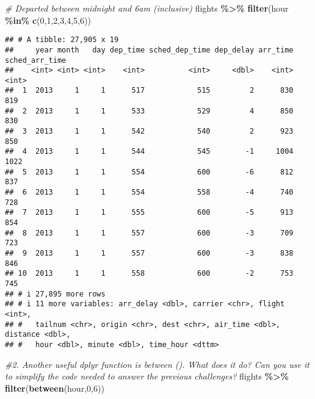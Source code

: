 \documentclass[
]{article}
\newenvironment{Shaded}{\begin{snugshade}}{\end{snugshade}}
\newcommand{\CommentTok}[1]{\textcolor[rgb]{0.56,0.35,0.01}{\textit{#1}}}
\newcommand{\DecValTok}[1]{\textcolor[rgb]{0.00,0.00,0.81}{#1}}
\newcommand{\FunctionTok}[1]{\textcolor[rgb]{0.13,0.29,0.53}{\textbf{#1}}}
\newcommand{\NormalTok}[1]{#1}
\newcommand{\SpecialCharTok}[1]{\textcolor[rgb]{0.81,0.36,0.00}{\textbf{#1}}}
\begin{document}
\begin{Shaded}
\begin{Highlighting}[]
  \CommentTok{\# Departed between midnight and 6am (inclusive)}
\NormalTok{  flights }\SpecialCharTok{\%\textgreater{}\%} \FunctionTok{filter}\NormalTok{(hour }\SpecialCharTok{\%in\%} \FunctionTok{c}\NormalTok{(}\DecValTok{0}\NormalTok{,}\DecValTok{1}\NormalTok{,}\DecValTok{2}\NormalTok{,}\DecValTok{3}\NormalTok{,}\DecValTok{4}\NormalTok{,}\DecValTok{5}\NormalTok{,}\DecValTok{6}\NormalTok{))}
\end{Highlighting}
\end{Shaded}

\begin{verbatim}
## # A tibble: 27,905 x 19
##     year month   day dep_time sched_dep_time dep_delay arr_time sched_arr_time
##    <int> <int> <int>    <int>          <int>     <dbl>    <int>          <int>
##  1  2013     1     1      517            515         2      830            819
##  2  2013     1     1      533            529         4      850            830
##  3  2013     1     1      542            540         2      923            850
##  4  2013     1     1      544            545        -1     1004           1022
##  5  2013     1     1      554            600        -6      812            837
##  6  2013     1     1      554            558        -4      740            728
##  7  2013     1     1      555            600        -5      913            854
##  8  2013     1     1      557            600        -3      709            723
##  9  2013     1     1      557            600        -3      838            846
## 10  2013     1     1      558            600        -2      753            745
## # i 27,895 more rows
## # i 11 more variables: arr_delay <dbl>, carrier <chr>, flight <int>,
## #   tailnum <chr>, origin <chr>, dest <chr>, air_time <dbl>, distance <dbl>,
## #   hour <dbl>, minute <dbl>, time_hour <dttm>
\end{verbatim}

\begin{Shaded}
\begin{Highlighting}[]
\CommentTok{\#2. Another useful dplyr function is between (). What does it do? Can you use it to simplify the code needed to answer the previous challenges?}
\NormalTok{flights }\SpecialCharTok{\%\textgreater{}\%} \FunctionTok{filter}\NormalTok{(}\FunctionTok{between}\NormalTok{(hour,}\DecValTok{0}\NormalTok{,}\DecValTok{6}\NormalTok{))}
\end{Highlighting}
\end{Shaded}
\end{document}
